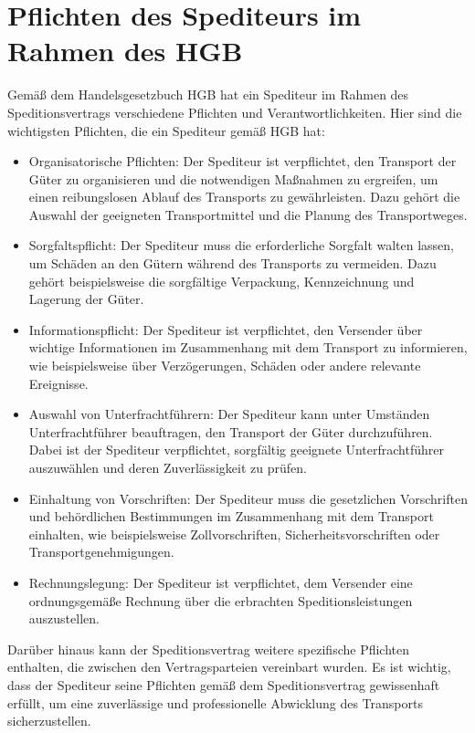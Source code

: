 \section{Pflichten des Spediteurs im Rahmen des \ac{HGB}}

Gemäß dem Handelsgesetzbuch \ac{HGB} hat ein Spediteur im Rahmen des Speditionsvertrags verschiedene Pflichten und Verantwortlichkeiten. Hier sind die wichtigsten Pflichten, die ein Spediteur gemäß \ac{HGB} hat:

\begin{itemize}
    \item Organisatorische Pflichten: Der Spediteur ist verpflichtet, den Transport der Güter zu organisieren und die notwendigen Maßnahmen zu ergreifen, um einen reibungslosen Ablauf des Transports zu gewährleisten. Dazu gehört die Auswahl der geeigneten Transportmittel und die Planung des Transportweges.
    \item Sorgfaltspflicht: Der Spediteur muss die erforderliche Sorgfalt walten lassen, um Schäden an den Gütern während des Transports zu vermeiden. Dazu gehört beispielsweise die sorgfältige Verpackung, Kennzeichnung und Lagerung der Güter.
    \item Informationspflicht: Der Spediteur ist verpflichtet, den Versender über wichtige Informationen im Zusammenhang mit dem Transport zu informieren, wie beispielsweise über Verzögerungen, Schäden oder andere relevante Ereignisse.
    \item Auswahl von Unterfrachtführern: Der Spediteur kann unter Umständen Unterfrachtführer beauftragen, den Transport der Güter durchzuführen. Dabei ist der Spediteur verpflichtet, sorgfältig geeignete Unterfrachtführer auszuwählen und deren Zuverlässigkeit zu prüfen.
    \item Einhaltung von Vorschriften: Der Spediteur muss die gesetzlichen Vorschriften und behördlichen Bestimmungen im Zusammenhang mit dem Transport einhalten, wie beispielsweise Zollvorschriften, Sicherheitsvorschriften oder Transportgenehmigungen.
    \item Rechnungslegung: Der Spediteur ist verpflichtet, dem Versender eine ordnungsgemäße Rechnung über die erbrachten Speditionsleistungen auszustellen.
    \end{itemize}

Darüber hinaus kann der Speditionsvertrag weitere spezifische Pflichten enthalten, die zwischen den Vertragsparteien vereinbart wurden. Es ist wichtig, dass der Spediteur seine Pflichten gemäß dem Speditionsvertrag gewissenhaft erfüllt, um eine zuverlässige und professionelle Abwicklung des Transports sicherzustellen.

